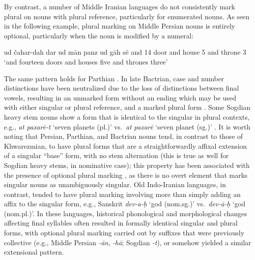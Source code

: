 \documentclass[11pt]{article}
\begin{document}
By contrast, a number of Middle Iranian languages do not consistently mark plural on nouns with plural reference, particularly for enumerated nouns.
As seen in the following example, plural marking on Middle Persian nouns is entirely optional, particularly when the noun is modified by a numeral:
\begin{example}
\gll ud \v{c}ahar-dah dar ud m\=an panz ud g\=ah s\=e
and 14 door and house 5 and throne 3
\glt `and fourteen doors and houses five and thrones three' \citep[223]{Skjaervo2009}
\glend
\end{example}
The same pattern holds for Parthian \citep[271]{DurkinMeisterernst2014}.
In late Bactrian, case and number distinctions have been neutralized due to the loss of distinctions between final vowels, resulting in an unmarked form without an ending which may be used with either singular or plural reference, and a marked plural form \citep[40]{SimsWilliams2007}.
Some Sogdian heavy stem nouns show a form that is identical to the singular in plural contexts, e.g., {\it a\textbeta t paxar\=e-t} `seven planets (pl.)' vs.\ {\it a\textbeta t paxar\=e} `seven planet (sg.)' \citep[313]{Yoshida2009}.
It is worth noting that Persian, Parthian, and Bactrian nouns tend, in contrast to those of Khwarezmian, to have plural forms that are a straightforwardly affixal extension of a singular ``base'' form, with no stem alternation (this is true as well for Sogdian heavy stems, in nominative case); this property has been associated with the presence of optional plural marking \citep[352--4]{Acquaviva2004}, as there is no overt element that marks singular nouns as unambiguously singular. 
Old Indo-Iranian languages, in contrast, tended to have plural marking involving more than simply adding an affix to the singular form, e.g., Sanskrit {\it dev-a-\d{h}} `god (nom.sg.)' vs.\ {\it dev-\=a-\d{h}} `god (nom.pl.)'. 
In these languages, historical phonological and morphological changes affecting final syllables often resulted in formally identical singular and plural forms, with optional plural marking carried out by suffixes that were previously collective (e.g., Middle Persian {\it -\=an}, {\it -h\=a}; Sogdian {\it -t}), or somehow yielded a similar extensional pattern. 
\end{document}
